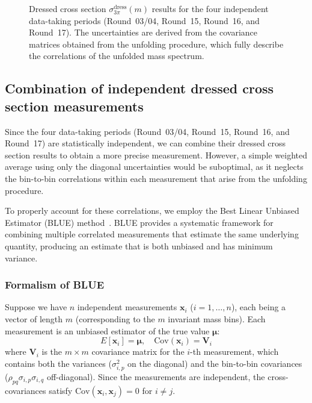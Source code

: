 \begin{figure}[htbp]
    \caption{Dressed cross section $\sigma_{3\pi}^{\text{dress}}(m)$ results for the four independent data-taking periods (Round~03/04, Round~15, Round~16, and Round~17). The uncertainties are derived from the covariance matrices obtained from the unfolding procedure, which fully describe the correlations of the unfolded mass spectrum.}
    \label{fig:sigma_dress_results_all_rounds}
\end{figure}

\clearpage
\subsection{Combination of independent dressed cross section measurements}

Since the four data-taking periods (Round~03/04, Round~15, Round~16, and Round~17) are statistically independent, we can combine their dressed cross section results to obtain a more precise measurement. However, a simple weighted average using only the diagonal uncertainties would be suboptimal, as it neglects the bin-to-bin correlations within each measurement that arise from the unfolding procedure.

To properly account for these correlations, we employ the Best Linear Unbiased Estimator (BLUE) method~\cite{Faliva2006}. BLUE provides a systematic framework for combining multiple correlated measurements that estimate the same underlying quantity, producing an estimate that is both unbiased and has minimum variance.

\subsubsection{Formalism of BLUE}

Suppose we have $n$ independent measurements $\mathbf{x}_i$ ($i = 1, \ldots, n$), each being a vector of length $m$ (corresponding to the $m$ invariant mass bins). Each measurement is an unbiased estimator of the true value $\boldsymbol{\mu}$:
\begin{equation}
    E[\mathbf{x}_i] = \boldsymbol{\mu}, \quad \text{Cov}(\mathbf{x}_i) = \mathbf{V}_i
\end{equation}
where $\mathbf{V}_i$ is the $m \times m$ covariance matrix for the $i$-th measurement, which contains both the variances ($\sigma_{i,p}^2$ on the diagonal) and the bin-to-bin covariances ($\rho_{pq}\sigma_{i,p}\sigma_{i,q}$ off-diagonal). Since the measurements are independent, the cross-covariances satisfy $\text{Cov}(\mathbf{x}_i, \mathbf{x}_j) = 0$ for $i \neq j$.

